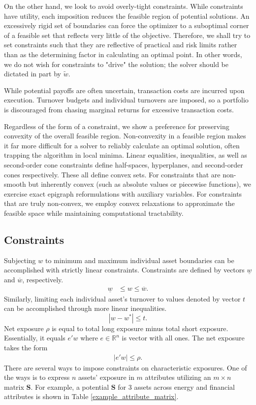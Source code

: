 \documentclass[11pt, letterpaper]{article}
\begin{document}
On the other hand, we look to avoid overly-tight constraints. While constraints have utility, each imposition reduces the feasible region of
potential solutions. An excessively rigid set of boundaries can force the optimizer to a suboptimal corner of a feasible set that
reflects very little of the objective.  Therefore, we shall try to set constraints such that they are reflective of practical and risk limits rather than as
the determining factor in calculating an optimal point. In other words, we do not wish for constraints to "drive" the solution;
the solver should be dictated in part by $\tilde{w}$.

While potential payoffs are often uncertain, transaction costs are incurred upon execution. Turnover budgets and individual
turnovers are imposed, so a portfolio is discouraged from chasing marginal returns for excessive transaction costs.

Regardless of the form of a constraint, we show a preference for preserving convexity of the overall feasible
region. Non-convexity in a feasible region makes it far more difficult for a solver to reliably calculate an optimal solution,
often trapping the algorithm in local minima. Linear equalities, inequalities, as well as second-order cone constraints
define half-spaces, hyperplanes, and second-order cones respectively. These all define convex sets. For constraints
that are non-smooth but inherently convex (such as absolute values or piecewise functions), we exercise exact epigraph
reformulations with auxiliary variables. For constraints that are truly non-convex, we employ convex relaxations to approximate
the feasible space while maintaining computational tractability.

\subsection{Constraints}
Subjecting $w$ to minimum and maximum individual asset boundaries can be accomplished with strictly linear constraints.
Constraints are defined by vectors $\underline{w}$ and $\overline{w}$, respectively.
\begin{align*}
    \underline{w} & \leq w \leq \overline{w}.
\end{align*}
Similarly, limiting each individual asset's turnover to values denoted by vector $t$ can be accomplished through
more linear inequalities.
\begin{equation*}
    |w - w^*| \leq t.
\end{equation*}
Net exposure $\rho$ is equal to total long exposure minus total short exposure. Essentially, it equals $e'w$ where
$e \in \mathds{R}^n$ is vector with all ones. The net exposure takes the form
\begin{align*}
	|e' w| \le \rho.
\end{align*}
There are several ways to impose constraints on characteristic exposures. One of the ways is to express $n$ assets' exposure in
$m$ attributes utilizing an $m\times n$ matrix $\mathbf{S}$.
For example, a potential $\mathbf{S}$ for 3 assets across energy and financial attributes is shown in Table
\ref{example_attribute_matrix}.
\end{document}
